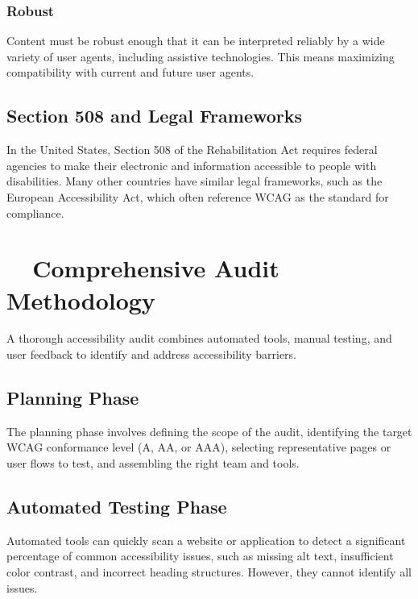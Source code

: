 \subsubsection{Robust}
\label{ssubsec:robust}
Content must be robust enough that it can be interpreted reliably by a wide variety of user agents, including assistive technologies. This means maximizing compatibility with current and future user agents.
\supercite{WCAGPrincipleRobust}

\subsection{Section 508 and Legal Frameworks}
\label{subsec:section508-legal}
In the United States, Section 508 of the Rehabilitation Act requires federal agencies to make their electronic and information  accessible to people with disabilities. Many other countries have similar legal frameworks, such as the European Accessibility Act, which often reference WCAG as the standard for compliance.
\supercite{Section5082018, Jaeger2006}

\section{~~Comprehensive Audit Methodology}
\label{sec:audit-methodology}
A thorough accessibility audit combines automated tools, manual testing, and user feedback to identify and address accessibility barriers.
\supercite{Henry2007}

\subsection{Planning Phase}
\label{subsec:planning-phase}
The planning phase involves defining the scope of the audit, identifying the target WCAG conformance level (A, AA, or AAA), selecting representative pages or user flows to test, and assembling the right team and tools.

\subsection{Automated Testing Phase}
\label{subsec:automated-testing-phase}
Automated tools can quickly scan a website or application to detect a significant percentage of common accessibility issues, such as missing alt text, insufficient color contrast, and incorrect heading structures. However, they cannot identify all issues.

